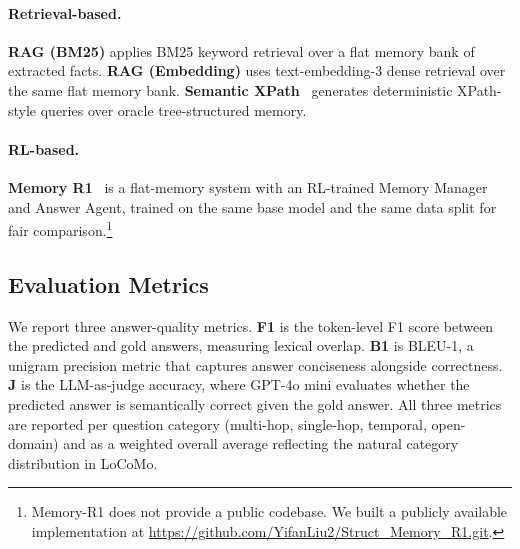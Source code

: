 \paragraph{Retrieval-based.}
\textbf{RAG (BM25)} applies BM25 keyword retrieval over a flat memory bank of extracted facts.
\textbf{RAG (Embedding)} uses text-embedding-3 dense retrieval over the same flat memory bank.
\textbf{Semantic XPath}~ generates deterministic XPath-style queries over oracle tree-structured memory.

\paragraph{RL-based.}
\textbf{Memory R1}~ is a flat-memory system with an RL-trained Memory Manager and Answer Agent, trained on the same base model and the same data split for fair comparison.\footnote{Memory-R1 does not provide a public codebase. We built a publicly available implementation at \url{https://github.com/YifanLiu2/Struct_Memory_R1.git}.}

\subsection{Evaluation Metrics}
We report three answer-quality metrics. \textbf{F1} is the token-level F1 score between the predicted and gold answers, measuring lexical overlap. \textbf{B1} is BLEU-1, a unigram precision metric that captures answer conciseness alongside correctness. \textbf{J} is the LLM-as-judge accuracy, where GPT-4o mini evaluates whether the predicted answer is semantically correct given the gold answer. All three metrics are reported per question category (multi-hop, single-hop, temporal, open-domain) and as a weighted overall average reflecting the natural category distribution in LoCoMo.

